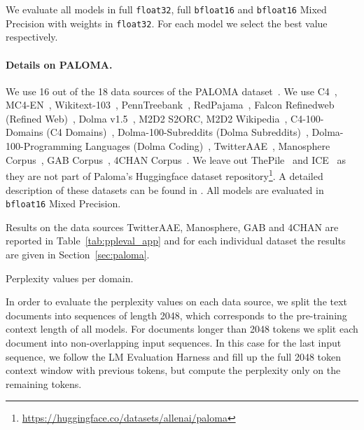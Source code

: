 \documentclass[dvipsnames]{article}
\begin{document}
\begin{appendix}
We evaluate all models in full \texttt{float32}, full \texttt{bfloat16} and \texttt{bfloat16} Mixed Precision with weights in \texttt{float32}. 
For each model we select the best value respectively.

\paragraph{Details on PALOMA.}
We use 16 out of the 18 data sources of the PALOMA dataset~\citep{Magnusson:23arxivshort}. 
We use C4~\citep{Raffel:19arxiv}, 
MC4-EN~\citep{Xue:21}, 
Wikitext-103~\citep{Merity:17}, 
PennTreebank~\citep{Vadas:11}, 
RedPajama~\citep{Together:23}, 
Falcon Refinedweb (Refined Web)~\citep{Penedo:23arxiv}, 
Dolma v1.5~\citep{Soldaini:24arxivshort}, 
M2D2 S2ORC, 
M2D2 Wikipedia~\citep{Reid:22}, 
C4-100-Domains (C4 Domains)~\citep{Chronopoulou:22}, 
Dolma-100-Subreddits (Dolma Subreddits)~\citep{Soldaini:24arxivshort}, 
Dolma-100-Programming Languages (Dolma Coding)~\citep{Soldaini:24arxivshort, Kocetkov:22arxiv}, 
TwitterAAE~\citep{Blodgett:16, Liang:23short}, 
Manosphere Corpus~\citep{Ribeiro:21}, 
GAB Corpus~\citep{Zannettou:18}, 
4CHAN Corpus~\citep{Papasavva:20}. 
We leave out ThePile~\citep{Gao:21arxiv} and ICE~\citep{Greenbaum:96} as they are not part of Paloma's Huggingface dataset repository\footnote{\url{https://huggingface.co/datasets/allenai/paloma}}.
A detailed description of these datasets can be found in \citet[Table~2]{Magnusson:23arxivshort}. 
%
All models are evaluated in \texttt{bfloat16} Mixed Precision. 

Results on the data sources %
TwitterAAE, Manosphere, GAB and 4CHAN are reported in 
Table~\ref{tab:ppleval_app} and for each individual dataset
the results are given in Section~\ref{sec:paloma}.


\begin{table}[htbp]
    \centering
    \begin{adjustbox}{width=0.6\textwidth}
        
    \end{adjustbox}
    \vspace{0.1cm}
    \caption{Perplexity values per domain.
    \label{tab:ppleval_app}
}  
\end{table}

In order to evaluate the perplexity values on each data source,
we split the text documents into sequences of length 2048, which corresponds to the pre-training context length of all models.
For documents longer than 2048 tokens we split each document into non-overlapping input sequences. 
In this case for the last input sequence, we follow the LM Evaluation Harness and fill up the full 2048 token context window with previous tokens, but compute the perplexity only on the remaining tokens.


\end{appendix}
\end{document}
